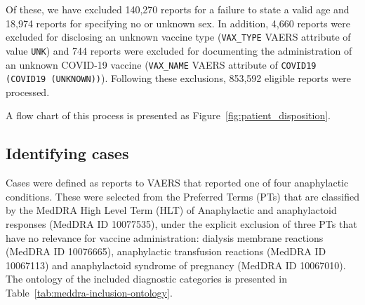 \documentclass{article}
\begin{document}
Of these, we have excluded 140,270 reports for a failure to state a valid age and 18,974 reports for specifying no or unknown sex.
In addition, 4,660 reports were excluded for disclosing an unknown vaccine type (\texttt{VAX\_TYPE} VAERS attribute of value \texttt{UNK}) and 744 reports were excluded for documenting the administration of an unknown COVID-19 vaccine (\texttt{VAX\_NAME} VAERS attribute of \texttt{COVID19 (COVID19 (UNKNOWN))}).
Following these exclusions, 853,592 eligible reports were processed.

A flow chart of this process is presented as Figure~\ref{fig:patient_disposition}.

\subsection{Identifying cases}\label{subsec:identifying-cases}

Cases were defined as reports to VAERS that reported one of four anaphylactic conditions.
These were selected from the Preferred Terms (PTs) that are classified by the MedDRA High Level Term (HLT) of Anaphylactic and anaphylactoid responses (MedDRA ID 10077535), under the explicit exclusion of three PTs that have no relevance for vaccine administration: dialysis membrane reactions (MedDRA ID 10076665), anaphylactic transfusion reactions (MedDRA ID 10067113) and anaphylactoid syndrome of pregnancy (MedDRA ID 10067010).
The ontology of the included diagnostic categories is presented in Table~\ref{tab:meddra-inclusion-ontology}.
\end{document}
